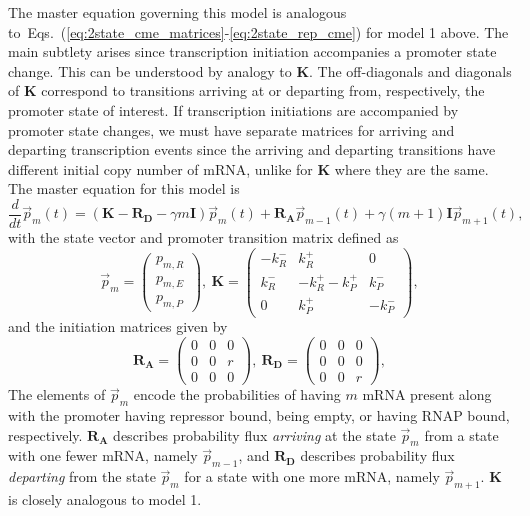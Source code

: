 \documentclass[12pt]{article}%
\newcommand{\vect}[1]{\vec{#1}}
\newcommand{\matr}[1]{\mathbf{#1}}
\newcommand{\deriv}[2][{}]{\frac{d #1}{d #2}}
\newcommand{\eqrange}[2]{Eqs.~(\ref{#1}-\ref{#2})}
\begin{document}
The master equation governing this model is analogous
to~\eqrange{eq:2state_cme_matrices}{eq:2state_rep_cme} for model 1 above.
The main subtlety arises since transcription initiation
accompanies a promoter state change.
This can be understood by analogy to $\matr{K}$. The
off-diagonals and diagonals of $\matr{K}$ correspond to
transitions arriving at or departing from, respectively, the
promoter state of interest. If transcription initiations are
accompanied by promoter state changes, we must have separate
matrices for arriving and departing transcription events since
the arriving and departing transitions have different initial
copy number of mRNA, unlike for $\matr{K}$ where they are the same.
The master equation for this model is
\begin{equation}
\deriv{t}\vect{p}_m(t) =
\left( \matr{K} - \matr{R_D} - \gamma m \matr{I} \right) \vect{p}_m(t)
                + \matr{R_A} \vect{p}_{m-1}(t) +
                \gamma (m+1) \matr{I} \vect{p}_{m+1}(t),
\label{eq:3state_rep_cme}
\end{equation}
with the state vector and promoter transition matrix defined as
\begin{equation}
\vect{p}_m = \begin{pmatrix} p_{m,R} \\ p_{m,E} \\ p_{m,P} \end{pmatrix},\
\matr{K} = \begin{pmatrix} -k_R^- & k_R^+ & 0 \\
                        k_R^- & -k_R^+ -k_P^+ & k_P^- \\
                        0 & k_P^+ & -k_P^- 
                \end{pmatrix},
\label{eq:3state_cme_matrices_pt1}
\end{equation}
and the initiation matrices given by
\begin{equation}
\matr{R_A} = \begin{pmatrix}
                0 & 0 & 0 \\ 0 & 0 & r \\ 0 & 0 & 0
                \end{pmatrix},\
\matr{R_D} = \begin{pmatrix}
                0 & 0 & 0 \\ 0 & 0 & 0 \\ 0 & 0 & r
                \end{pmatrix},
\label{eq:3state_cme_matrices_pt2}
\end{equation}
The elements of $\vect{p}_m$ encode the probabilities of having
$m$ mRNA present along with the promoter having repressor bound,
being empty, or having RNAP bound, respectively.
$\matr{R_A}$ describes probability flux \textit{arriving} at the state
$\vect{p}_m$ from a state with one fewer mRNA, namely
$\vect{p}_{m-1}$, and $\matr{R_D}$ describes probability flux
\textit{departing} from the state $\vect{p}_m$
for a state with one more mRNA, namely $\vect{p}_{m+1}$.
$\matr{K}$ is closely analogous to model 1.
\end{document}
